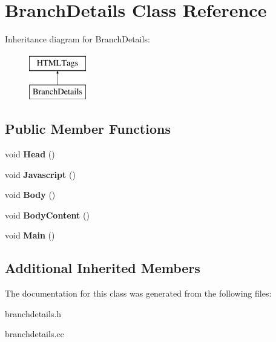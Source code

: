 \hypertarget{classBranchDetails}{\section{Branch\-Details Class Reference}
\label{classBranchDetails}
}
Inheritance diagram for Branch\-Details\-:\begin{figure}[H]
\begin{center}
\leavevmode
\includegraphics[height=2.000000cm]{classBranchDetails}
\end{center}
\end{figure}
\subsection*{Public Member Functions}
\begin{DoxyCompactItemize}
\item 
\hypertarget{classBranchDetails_a73ad3b9f45e8608a54c68f951149f7b4}{void {\bfseries Head} ()}\label{classBranchDetails_a73ad3b9f45e8608a54c68f951149f7b4}

\item 
\hypertarget{classBranchDetails_a526355c7a1abcd150805d859a6d0d576}{void {\bfseries Javascript} ()}\label{classBranchDetails_a526355c7a1abcd150805d859a6d0d576}

\item 
\hypertarget{classBranchDetails_a4a564cea32737e719441566d284ff849}{void {\bfseries Body} ()}\label{classBranchDetails_a4a564cea32737e719441566d284ff849}

\item 
\hypertarget{classBranchDetails_abfba4740c8618388b79eb6550aad980a}{void {\bfseries Body\-Content} ()}\label{classBranchDetails_abfba4740c8618388b79eb6550aad980a}

\item 
\hypertarget{classBranchDetails_aa44ca0b62d7a37d6723f6135c1672058}{void {\bfseries Main} ()}\label{classBranchDetails_aa44ca0b62d7a37d6723f6135c1672058}

\end{DoxyCompactItemize}
\subsection*{Additional Inherited Members}


The documentation for this class was generated from the following files\-:\begin{DoxyCompactItemize}
\item 
branchdetails.\-h\item 
branchdetails.\-cc\end{DoxyCompactItemize}
